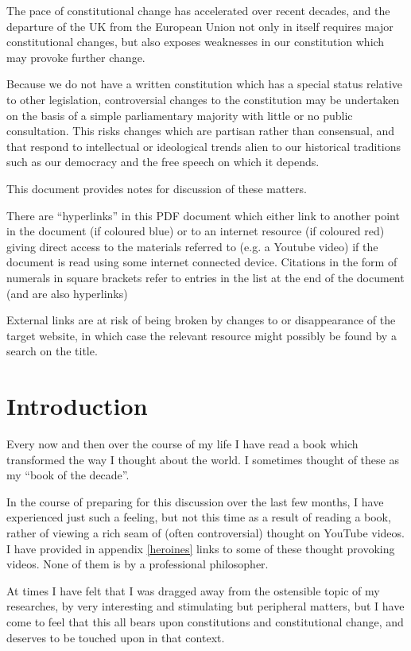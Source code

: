 \documentclass[14pt,titlepage]{extarticle}
\begin{document}

The pace of constitutional change has accelerated over recent decades,
and the departure of the UK from the European Union not only in itself
requires major constitutional changes, but also exposes weaknesses in
our constitution which may provoke further change.
 
Because we do not have a written constitution which has a special status
relative to other legislation, controversial changes to the constitution
may be undertaken on the basis of a simple parliamentary majority with little
or no public consultation.
This risks changes which are partisan rather than consensual, and that respond
to intellectual or ideological trends alien to our historical traditions such as
our democracy and the free speech on which it depends.
 
This document provides notes for discussion of these matters.

There are ``hyperlinks'' in this PDF document which either link to another point in the document  (if coloured blue) or to an internet resource  (if coloured red) giving direct access to the materials referred to (e.g. a Youtube video) if the document is read using some internet connected device.
Citations in the form of numerals in square brackets refer to entries in the list at the end of the document (and are also hyperlinks)

External links are at risk of being broken by changes to or disappearance of the target website, in which case the relevant resource might possibly be found by a search on the title.

\section{Introduction}

Every now and then over the course of my life I have read a book which transformed the way I thought about the world.
I sometimes thought of these as my ``book of the decade''.

In the course of preparing for this discussion over the last few months, I have experienced just such a feeling, but not this time as a result of reading a book, rather of viewing a rich seam of (often controversial) thought on YouTube videos.
I have provided in appendix \ref{heroines} links to some of these thought provoking videos.
None of them is by a professional philosopher.

At times I have felt that I was dragged away from the ostensible topic of my researches, by very interesting and stimulating but peripheral matters, but I have come to feel that this all bears upon constitutions and constitutional change, and deserves to be touched upon in that context.
\end{document}
